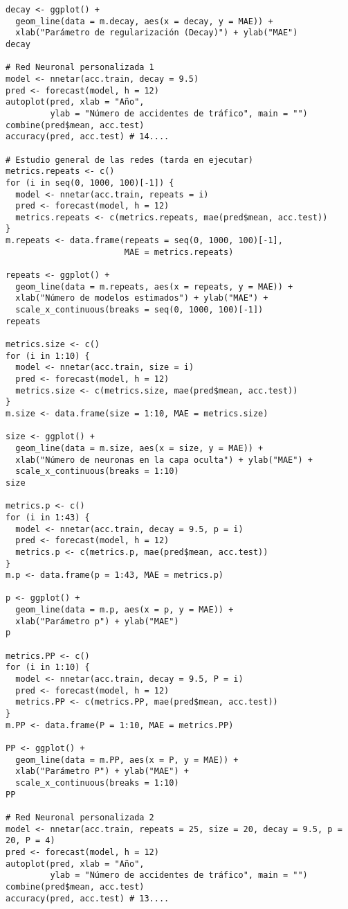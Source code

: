 \documentclass[12pt,a4paper,oneside]{article}
\begin{document}
\begin{Verbatim}[fontsize=\footnotesize]
decay <- ggplot() +
  geom_line(data = m.decay, aes(x = decay, y = MAE)) +
  xlab("Parámetro de regularización (Decay)") + ylab("MAE")
decay

# Red Neuronal personalizada 1
model <- nnetar(acc.train, decay = 9.5)
pred <- forecast(model, h = 12)
autoplot(pred, xlab = "Año",
         ylab = "Número de accidentes de tráfico", main = "")
combine(pred$mean, acc.test)
accuracy(pred, acc.test) # 14....

# Estudio general de las redes (tarda en ejecutar)
metrics.repeats <- c()
for (i in seq(0, 1000, 100)[-1]) {
  model <- nnetar(acc.train, repeats = i)
  pred <- forecast(model, h = 12)
  metrics.repeats <- c(metrics.repeats, mae(pred$mean, acc.test))
}
m.repeats <- data.frame(repeats = seq(0, 1000, 100)[-1],
                        MAE = metrics.repeats)

repeats <- ggplot() +
  geom_line(data = m.repeats, aes(x = repeats, y = MAE)) +
  xlab("Número de modelos estimados") + ylab("MAE") +
  scale_x_continuous(breaks = seq(0, 1000, 100)[-1])
repeats

metrics.size <- c()
for (i in 1:10) {
  model <- nnetar(acc.train, size = i)
  pred <- forecast(model, h = 12)
  metrics.size <- c(metrics.size, mae(pred$mean, acc.test))
}
m.size <- data.frame(size = 1:10, MAE = metrics.size)

size <- ggplot() +
  geom_line(data = m.size, aes(x = size, y = MAE)) +
  xlab("Número de neuronas en la capa oculta") + ylab("MAE") +
  scale_x_continuous(breaks = 1:10)
size

metrics.p <- c()
for (i in 1:43) {
  model <- nnetar(acc.train, decay = 9.5, p = i)
  pred <- forecast(model, h = 12)
  metrics.p <- c(metrics.p, mae(pred$mean, acc.test))
}
m.p <- data.frame(p = 1:43, MAE = metrics.p)

p <- ggplot() +
  geom_line(data = m.p, aes(x = p, y = MAE)) +
  xlab("Parámetro p") + ylab("MAE")
p

metrics.PP <- c()
for (i in 1:10) {
  model <- nnetar(acc.train, decay = 9.5, P = i)
  pred <- forecast(model, h = 12)
  metrics.PP <- c(metrics.PP, mae(pred$mean, acc.test))
}
m.PP <- data.frame(P = 1:10, MAE = metrics.PP)

PP <- ggplot() +
  geom_line(data = m.PP, aes(x = P, y = MAE)) +
  xlab("Parámetro P") + ylab("MAE") +
  scale_x_continuous(breaks = 1:10)
PP

# Red Neuronal personalizada 2
model <- nnetar(acc.train, repeats = 25, size = 20, decay = 9.5, p = 20, P = 4)
pred <- forecast(model, h = 12)
autoplot(pred, xlab = "Año",
         ylab = "Número de accidentes de tráfico", main = "")
combine(pred$mean, acc.test)
accuracy(pred, acc.test) # 13....


\end{Verbatim}
\end{document}

